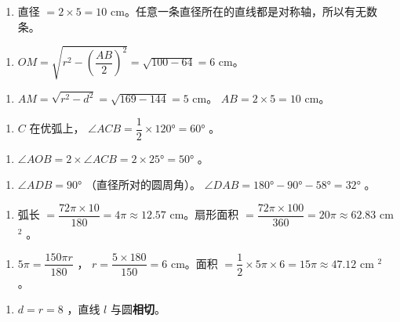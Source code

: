 \begin{answer}


\begin{enumerate}
  \item 直径 $= 2 \times 5 = 10$ cm。任意一条直径所在的直线都是对称轴，所以有无数条。
\end{enumerate}


\begin{enumerate}
  \item $OM = \sqrt{r^2 - \left(\dfrac{AB}{2}\right)^2} = \sqrt{100 - 64} = 6$ cm。
\end{enumerate}


\begin{enumerate}
  \item $AM = \sqrt{r^2 - d^2} = \sqrt{169 - 144} = 5$ cm。 $AB = 2 \times 5 = 10$ cm。
\end{enumerate}


\begin{enumerate}
  \item $C$ 在优弧上， $\angle ACB = \dfrac{1}{2} \times 120° = 60°$ 。
\end{enumerate}


\begin{enumerate}
  \item $\angle AOB = 2 \times \angle ACB = 2 \times 25° = 50°$ 。
\end{enumerate}


\begin{enumerate}
  \item $\angle ADB = 90°$ （直径所对的圆周角）。 $\angle DAB = 180° - 90° - 58° = 32°$ 。
\end{enumerate}


\begin{enumerate}
  \item 弧长 $= \dfrac{72\pi \times 10}{180} = 4\pi \approx 12.57$ cm。扇形面积 $= \dfrac{72\pi \times 100}{360} = 20\pi \approx 62.83$ cm $^2$ 。
\end{enumerate}


\begin{enumerate}
  \item $5\pi = \dfrac{150\pi r}{180}$ ， $r = \dfrac{5 \times 180}{150} = 6$ cm。面积 $= \dfrac{1}{2} \times 5\pi \times 6 = 15\pi \approx 47.12$ cm $^2$ 。
\end{enumerate}


\begin{enumerate}
  \item $d = r = 8$ ，直线 $l$ 与圆\textbf{相切}。
\end{enumerate}



\end{answer}
